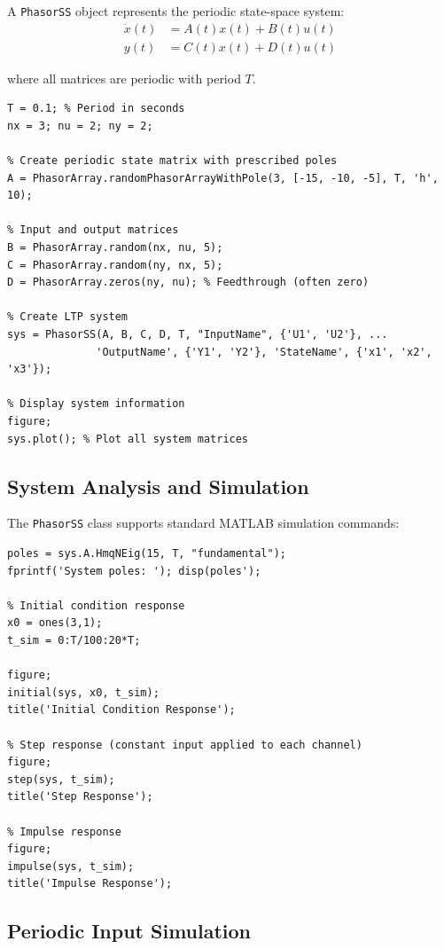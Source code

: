 \documentclass[11pt,a4paper]{article}
\begin{document}
A \texttt{PhasorSS} object represents the periodic state-space system:
\begin{align}
\dot{x}(t) &= A(t)x(t) + B(t)u(t) \\
y(t) &= C(t)x(t) + D(t)u(t)
\end{align}

where all matrices are periodic with period $T$.

\begin{lstlisting}[style=matlabstyle]
% Define periodic system matrices
T = 0.1; % Period in seconds
nx = 3; nu = 2; ny = 2;

% Create periodic state matrix with prescribed poles
A = PhasorArray.randomPhasorArrayWithPole(3, [-15, -10, -5], T, 'h', 10);

% Input and output matrices
B = PhasorArray.random(nx, nu, 5);
C = PhasorArray.random(ny, nx, 5);
D = PhasorArray.zeros(ny, nu); % Feedthrough (often zero)

% Create LTP system
sys = PhasorSS(A, B, C, D, T, "InputName", {'U1', 'U2'}, ...
              'OutputName', {'Y1', 'Y2'}, 'StateName', {'x1', 'x2', 'x3'});

% Display system information
figure;
sys.plot(); % Plot all system matrices
\end{lstlisting}

\subsection{System Analysis and Simulation}

The \texttt{PhasorSS} class supports standard MATLAB simulation commands:

\begin{lstlisting}[style=matlabstyle]
% Analyze system stability
poles = sys.A.HmqNEig(15, T, "fundamental");
fprintf('System poles: '); disp(poles');

% Initial condition response
x0 = ones(3,1);
t_sim = 0:T/100:20*T;

figure;
initial(sys, x0, t_sim);
title('Initial Condition Response');

% Step response (constant input applied to each channel)
figure;
step(sys, t_sim);
title('Step Response');

% Impulse response
figure;
impulse(sys, t_sim);
title('Impulse Response');
\end{lstlisting}

\subsection{Periodic Input Simulation}
\end{document}

